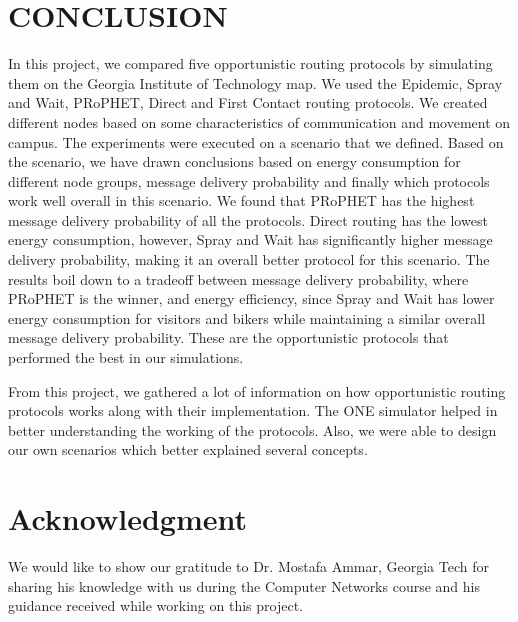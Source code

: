 \documentclass[conference]{IEEEtran}
\begin{document}
\section{CONCLUSION}
In this project, we compared five opportunistic routing protocols by simulating them on the Georgia Institute of Technology map. We used the Epidemic, Spray and Wait, PRoPHET, Direct and First Contact routing protocols. We created different nodes based on some characteristics of communication and movement on campus. The experiments were executed on a scenario that we defined. Based on the scenario, we have drawn conclusions based on energy consumption for different node groups, message delivery probability and finally which protocols work well overall in this scenario. We found that PRoPHET has the highest message delivery probability of all the protocols. Direct routing has the lowest energy consumption, however, Spray and Wait has significantly higher message delivery probability, making it an overall better protocol for this scenario. The results boil down to a tradeoff between message delivery probability, where PRoPHET is the winner, and energy efficiency, since Spray and Wait has lower energy consumption for visitors and bikers while maintaining a similar overall message delivery probability. These are the opportunistic protocols that performed the best in our simulations.

From this project, we gathered a lot of information on how opportunistic routing protocols works along with their implementation. The ONE simulator helped in better understanding the working of the protocols. Also, we were able to design our own scenarios which better explained several concepts.


\section*{Acknowledgment}

We would like to show our gratitude to Dr. Mostafa Ammar, Georgia Tech for sharing his knowledge with us during the Computer Networks course and his guidance received while working on this project.
\end{document}
